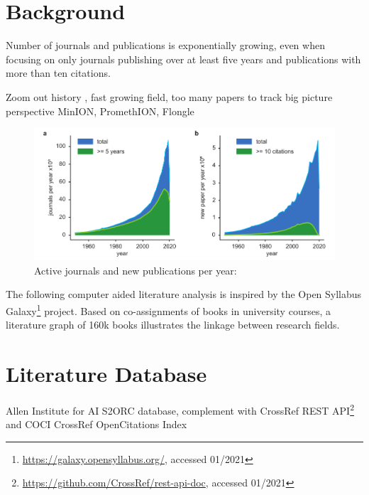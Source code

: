 \section{Background}
\label{sec:state_of_art:background}

Number of journals and publications is exponentially growing, even when focusing on only journals publishing over at least five years and publications with more than ten citations.


Zoom out history \cite{Deamer2016}, fast growing field, too many papers to track big picture perspective
MinION, PromethION, Flongle

\begin{figure}[h]
	\centering
	\includegraphics[width=1.0\textwidth]{figures/state_of_art/paper_count.pdf}
	\captionsetup{format=plain}
	\caption[Journals and publications per year]{Active journals and new publications per year:}
	\label{fig:state_of_art:paper_count}
\end{figure}

The following computer aided literature analysis is inspired by the Open Syllabus Galaxy\footnote{\url{https://galaxy.opensyllabus.org/}, accessed 01/2021} project.
Based on co-assignments of books in university courses, a literature graph of 160k books illustrates the linkage between research fields.




\section{Literature Database}
\label{sec:state_of_art:database}

Allen Institute for AI S2ORC database, complement with CrossRef REST API\footnote{\url{https://github.com/CrossRef/rest-api-doc}, accessed 01/2021}
and COCI CrossRef OpenCitations Index


